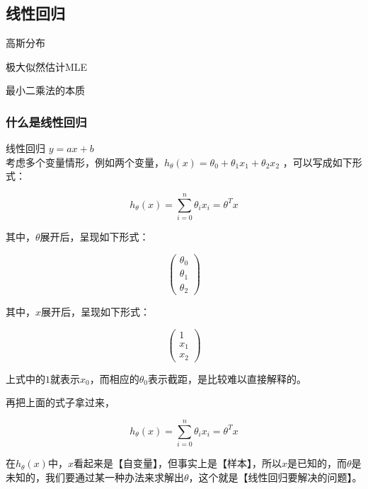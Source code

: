 \documentclass[UTF8]{ctexbook}
\begin{document}
\subsection{线性回归}
高斯分布

极大似然估计MLE

最小二乘法的本质

\subsubsection{什么是线性回归}
线性回归
$y=ax+b$\\

考虑多个变量情形，例如两个变量，$h_{\theta}(x)=\theta_{0}+\theta_{1}x_{1}+\theta_{2}x_{2}$ ，可以写成如下形式：

\begin{displaymath}
h_{\theta}(x)=\sum_{i=0}^{n}\theta_{i}x_{i}=\theta^{T}x
\end{displaymath}

其中，$\theta$展开后，呈现如下形式：

\[ \left( \begin{array}{c}
\theta_{0} \\
\theta_{1} \\
\theta_{2} \end{array} \right)\]

其中，$x$展开后，呈现如下形式：

\[ \left( \begin{array}{c}
1 \\
x_{1} \\
x_{2} \end{array} \right)\]

上式中的$1$就表示$x_{0}$，而相应的$\theta_{0}$表示截距，是比较难以直接解释的。



再把上面的式子拿过来，

\begin{displaymath}
h_{\theta}(x)=\sum_{i=0}^{n}\theta_{i}x_{i}=\theta^{T}x
\end{displaymath}

在$h_{\theta}(x)$中，$x$看起来是【自变量】，但事实上是【样本】，所以$x$是已知的，而$\theta$是未知的，我们要通过某一种办法来求解出$\theta$，这个就是【线性回归要解决的问题】。
\end{document}
